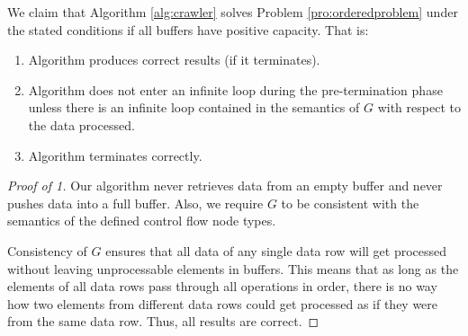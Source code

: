   We claim that Algorithm \ref{alg:crawler} solves Problem \ref{pro:orderedproblem} under the stated conditions if all buffers have positive capacity. That is:
\begin{enumerate}
  \item Algorithm produces correct results (if it terminates).
  \item Algorithm does not enter an infinite loop during the pre-termination phase unless there is an infinite loop contained in the semantics of $G$ with respect to the data processed.
  \item Algorithm terminates correctly.
\end{enumerate}
\begin{proof}[Proof of 1]
  Our algorithm never retrieves data from an empty buffer and never pushes data into a full buffer. Also, we require $G$ to be consistent with the semantics of the defined control flow node types.  

  Consistency of $G$ ensures that all data of any single data row will get processed without leaving unprocessable elements in buffers. This means that as long as the elements of all data rows pass through all operations in order, there is no way how two elements from different data rows could get processed as if they were from the same data row.  Thus, all results are correct. 
\end{proof}
